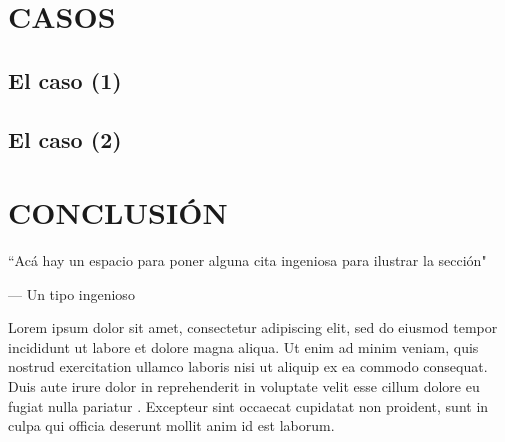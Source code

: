 
\section{CASOS}

\lipsum[1]


\subsection{El caso (1)}

\lipsum[1]


\subsection{El caso (2)}


\lipsum[1]

\clearpage



\section{CONCLUSIÓN}


\epigraph{``Acá hay un espacio para poner alguna cita ingeniosa para ilustrar la sección"}{--- \textup{Un tipo ingenioso}}



Lorem ipsum dolor sit amet, consectetur adipiscing elit, sed do eiusmod tempor incididunt ut labore et dolore magna aliqua. Ut enim ad minim veniam, quis nostrud exercitation ullamco laboris nisi ut aliquip ex ea commodo consequat. Duis aute irure dolor in reprehenderit \cite{ruiz_nicolini_juan_pablo_fuego_nodate} in voluptate velit esse cillum dolore eu fugiat nulla pariatur \citep{ruiz_nicolini_impacto_2017}. Excepteur sint occaecat cupidatat non proident, sunt in culpa qui officia deserunt mollit anim id est laborum. %

\lipsum[1-3]

\clearpage

\renewcommand{\bibname}{REFERENCIAS}%



